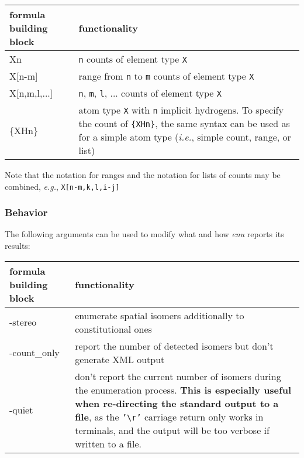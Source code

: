 \documentclass[a4paper,11pt]{article}
\begin{document}
\begin{table}[H]
\begin{tabular}{>{\ttfamily\raggedright}p{}|p{}}
    \hline
    \textnormal{formula building block} & functionality \\
    \hline\hline
    Xn           & \texttt{n} counts of element type \texttt{X} \\
    \hline
    X[n-m]       & range from \texttt{n} to \texttt{m} counts of element type \texttt{X}\\
    \hline
    X[n,m,l,...] & \texttt{n}, \texttt{m}, \texttt{l}, ... counts of element type \texttt{X} \\
    \hline
    \{XHn\}      & atom type \texttt{X} with \texttt{n} implicit hydrogens. To specify the count of \texttt{\{XHn\}}, the same syntax can be used as for a simple atom type (\textit{i.e.}, simple count, range, or list) \\
    \hline
\end{tabular}
\end{table}

Note that the notation for ranges and the notation for lists of counts may be combined, \textit{e.g.}, \texttt{X[n-m,k,l,i-j]}

\subsubsection{Behavior}

The following arguments can be used to modify what and how \textit{enu} reports its results:

\begin{table}[H]
\begin{tabular}{>{\ttfamily\raggedright}p{}|p{}}
    \hline
    \textnormal{formula building block} & functionality \\
    \hline\hline
    -stereo & enumerate spatial isomers additionally to constitutional ones\\
    \hline
    -count\_only & report the number of detected isomers but don't generate XML output\\
    \hline
    -quiet & don't report the current number of isomers during the enumeration process. \textbf{This is especially useful when re-directing the standard output to a file}, as the \texttt{'\textbackslash r'} carriage return only works in terminals, and the output will be too verbose if written to a file.\\
    \hline
\end{tabular}
\end{table}
\end{document}
